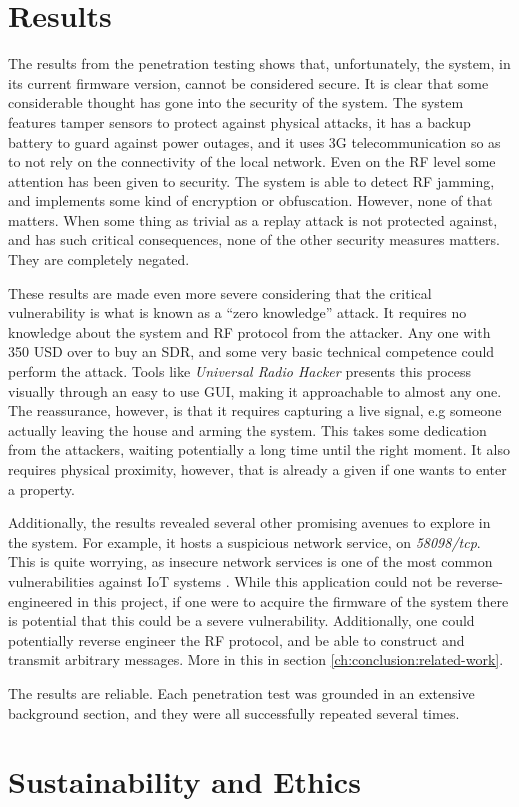 \section{Results}
The results from the penetration testing shows that, unfortunately, the system, in its current firmware version, cannot be considered secure. It is clear that some considerable thought has gone into the security of the system. The system features tamper sensors to protect against physical attacks, it has a backup battery to guard against power outages, and it uses 3G telecommunication so as to not rely on the connectivity of the local network. Even on the RF level some attention has been given to security. The system is able to detect RF jamming, and implements some kind of encryption or obfuscation. However, none of that matters. When some thing as trivial as a replay attack is not protected against, and has such critical consequences, none of the other security measures matters. They are completely negated.

These results are made even more severe considering that the critical vulnerability is what is known as a \enquote{zero knowledge} attack. It requires no knowledge about the system and RF protocol from the attacker. Any one with 350 USD over to buy an SDR, and some very basic technical competence could perform the attack. Tools like \textit{Universal Radio Hacker} \cite{urh} presents this process visually through an easy to use GUI, making it approachable to almost any one. The reassurance, however, is that it requires capturing a live signal, e.g someone actually leaving the house and arming the system. This takes some dedication from the attackers, waiting potentially a long time until the right moment. It also requires physical proximity, however, that is already a given if one wants to enter a property.

Additionally, the results revealed several other promising avenues to explore in the system. For example, it hosts a suspicious network service, on \textit{58098/tcp}. This is quite worrying, as insecure network services is one of the most common vulnerabilities against IoT systems \cite{owasp-iot-top10}. While this application could not be reverse-engineered in this project, if one were to acquire the firmware of the system there is potential that this could be a severe vulnerability. Additionally, one could potentially reverse engineer the RF protocol, and be able to construct and transmit arbitrary messages. More in this in section \ref{ch:conclusion:related-work}.

The results are reliable. Each penetration test was grounded in an extensive background section, and they were all successfully repeated several times.

\section{Sustainability and Ethics}
\todo
